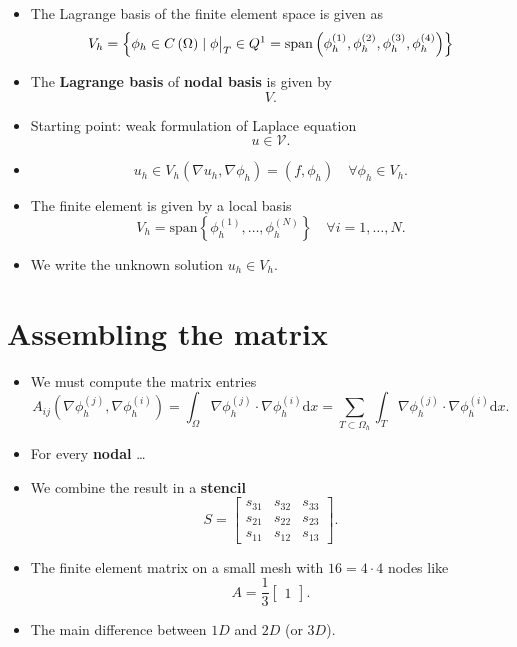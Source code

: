 \documentclass[openany,a4paper,11pt]{memoir}
\theoremstyle{definition}
\newcommand\restr[2]{{%
  \left.\kern-\nulldelimiterspace %
  #1 %
  \vphantom{\big|} %
  \right|_{#2} %
  }}
\begin{document}
\begin{itemize}
\item The Lagrange basis of the finite element space is given as \[ V_h=\left\{\phi_h\in C\left(\Omega\right)\mid\restr{\phi}{T}\in Q^1=\mathrm{span}\left(\phi^{(1)}_h,\phi^{(2)}_h,\phi^{(3)}_h,\phi^{(4)}_h\right) \right\}\]
\item The \textbf{Lagrange basis} of \textbf{nodal basis} is given by \[ V. \]
\end{itemize}

\begin{itemize}
\item Starting point: weak formulation of Laplace equation \[u\in\mathcal{V}. \]
\item \[u_h\in V_h \left(\nabla u_h,\nabla\phi_h\right)=\left(f,\phi_h\right)\quad\forall\phi_h\in V_h. \]
\item The finite element is given by a local basis \[V_h=\text{span}\left\{\phi^{(1)}_h,\ldots,\phi^{(N)}_h\right\}\quad\forall i=1,\ldots, N. \]
\item We write the unknown solution $u_h\in V_h$.
\end{itemize}

\section{Assembling the matrix}

\begin{itemize}
\item We must compute the matrix entries \[A_{ij}\left(\nabla\phi_h^{(j)}, \nabla\phi_h^{(i)}\right)=\int_\Omega\nabla\phi_h^{(j)}\cdot\nabla\phi_h^{(i)}\mathrm{d}x=\sum_{T\subset\Omega_h}\int_T\nabla\phi_h^{(j)}\cdot\nabla\phi_h^{(i)}\mathrm{d}x. \]
\item For every \textbf{nodal} \ldots
\end{itemize}

\begin{itemize}
\item We combine the result in a \textbf{stencil} \[S=\begin{bmatrix}s_{31} & s_{32} & s_{33}\\s_{21} & s_{22} & s_{23}\\s_{11} & s_{12} & s_{13}\end{bmatrix}.\]
\item The finite element matrix on a small mesh with $16=4\cdot 4$ nodes like \[A=\frac{1}{3}\begin{bmatrix}1\end{bmatrix}.\]
\end{itemize}

\begin{itemize}
\item The main difference between $1D$ and $2D$ (or $3D$).
\end{itemize}
\end{document}
